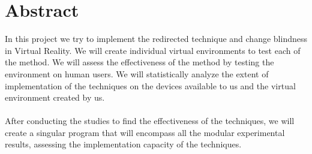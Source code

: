 \documentclass[12pt]{article}
\begin{document}
\section*{Abstract}
In this project we try to implement the redirected technique and change blindness in Virtual Reality. We will create individual virtual environments to test each of the method. We will assess the effectiveness of the method by testing the environment on human users. We will statistically analyze the extent of implementation of the techniques on the devices available to us and the virtual environment created by us. \\
\\
After conducting the studies to find the effectiveness of the techniques, we will create a singular program that will encompass all the modular experimental results, assessing the implementation capacity of the techniques.

\clearpage

\tableofcontents
{}
\clearpage

\listoftables
{}
\clearpage

\listoffigures
{}
\clearpage



\clearpage

\end{document}
